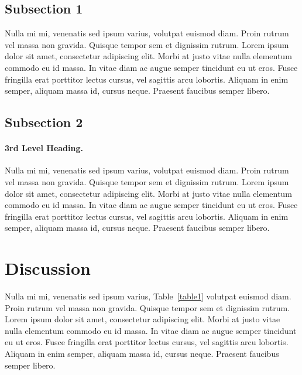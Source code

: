 \documentclass[10pt,letterpaper]{article}
\begin{document}
\subsection*{Subsection 1}
Nulla mi mi, venenatis sed ipsum varius, volutpat euismod diam. Proin rutrum vel massa non gravida. Quisque tempor sem et dignissim rutrum. Lorem ipsum dolor sit amet, consectetur adipiscing elit. Morbi at justo vitae nulla elementum commodo eu id massa. In vitae diam ac augue semper tincidunt eu ut eros. Fusce fringilla erat porttitor lectus cursus, vel sagittis arcu lobortis. Aliquam in enim semper, aliquam massa id, cursus neque. Praesent faucibus semper libero.

\subsection*{Subsection 2}
\paragraph{3rd Level Heading.} Nulla mi mi, venenatis sed ipsum varius, volutpat euismod diam. Proin rutrum vel massa non gravida. Quisque tempor sem et dignissim rutrum. Lorem ipsum dolor sit amet, consectetur adipiscing elit. Morbi at justo vitae nulla elementum commodo eu id massa. In vitae diam ac augue semper tincidunt eu ut eros. Fusce fringilla erat porttitor lectus cursus, vel sagittis arcu lobortis. Aliquam in enim semper, aliquam massa id, cursus neque. Praesent faucibus semper libero.

\section*{Discussion}
Nulla mi mi, venenatis sed ipsum varius, Table~\ref{table1} volutpat euismod diam. Proin rutrum vel massa non gravida. Quisque tempor sem et dignissim rutrum. Lorem ipsum dolor sit amet, consectetur adipiscing elit. Morbi at justo vitae nulla elementum commodo eu id massa. In vitae diam ac augue semper tincidunt eu ut eros. Fusce fringilla erat porttitor lectus cursus, vel sagittis arcu lobortis. Aliquam in enim semper, aliquam massa id, cursus neque. Praesent faucibus semper libero.
\end{document}
